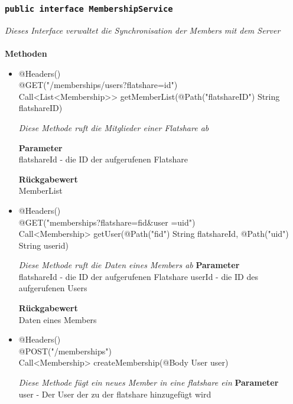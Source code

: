              	\subsubsection{\texttt{public interface  MembershipService }}
        \textit{Dieses Interface verwaltet die Synchronisation der Members mit dem Server}\\
        \\
		\textbf{Methoden} \\
 			\begin{itemize}
        		\item{@Headers()\\ @GET("/memberships/users?flatshare={id}") \\ Call<List<Membership>> getMemberList(@Path("flatshareID") String flatshareID)}
        	
        		\textit{Diese Methode ruft die Mitglieder einer Flatshare ab}
        	
        		\textbf{Parameter} \\
                flatshareId - die ID der aufgerufenen Flatshare  
        		        	
       		 	\textbf{Rückgabewert} \\
                MemberList
      		  	 
      	      \item{@Headers()\\ @GET("memberships?flatshare={fid}\&user ={uid}")\\Call<Membership> getUser(@Path("fid") String flatshareId, @Path("uid") String userid)}
        	
      	 	 	\textit{Diese Methode ruft die Daten eines Members ab}        	
        		\textbf{Parameter} \\
        		flatshareId - die ID der aufgerufenen Flatshare 
                userId - die ID des aufgerufenen Users
        	
        		\textbf{Rückgabewert} \\
              Daten eines Members
        	
                      	 
      	      \item{@Headers()\\ @POST("/memberships")\\ Call<Membership> createMembership(@Body User user)}
        	
      	 	 	\textit{Diese Methode fügt ein neues Member in eine flatshare ein}        	
        		\textbf{Parameter} \\
        		user - Der User der zu der flatshare hinzugefügt wird 
        	

\end{itemize}
